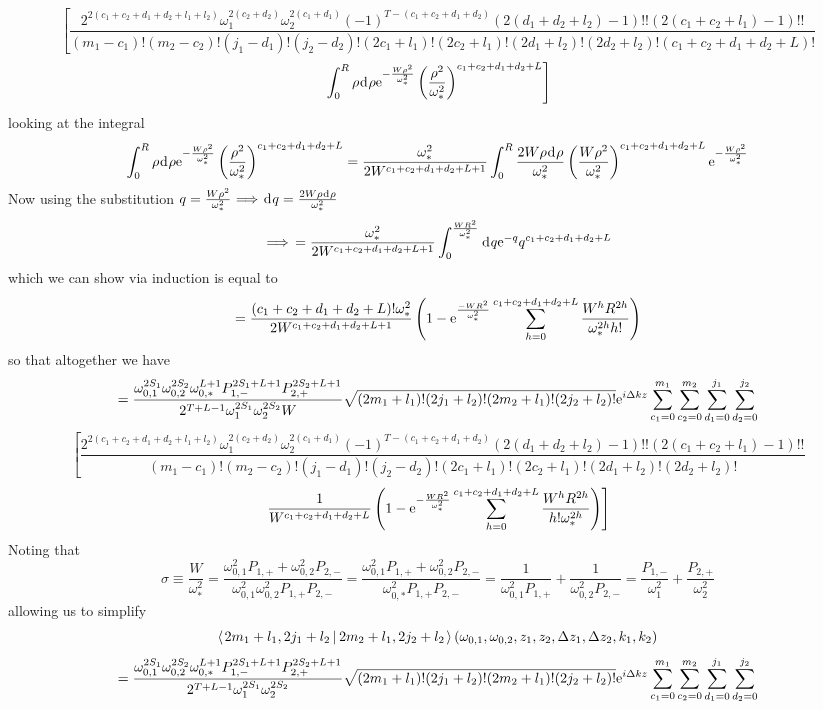 \documentclass[11pt]{amsart}
\makeatletter
\newcommand{\e}{{\rm e}}				%
\newcommand{\msp}[1]{\mspace{#1mu}}		%
\newcommand{\0}{\varnothing}		%
\DeclareMathOperator*{\im}{\, \Longrightarrow \,}	%
\newcommand{\eq}{\equiv}		%
\newcommand{\dd}{\msp{1} {\rm{d}} \msp{1}}	%
\newcommand{\brac}[2]{\left\langle\msp{2} #1\left\lvert \msp{3.5} #2 \right.\right\rangle}	%
\newcommand{\1}{!}
\newcommand{\2}{@}
\newcommand{\3}{\#}
\newcommand{\4}{\$}
\newcommand{\5}{\%}
\newcommand{\6}{$^\wedge$}
\newcommand{\7}{\&}
\newcommand{\8}{*}
\newcommand{\9}{(}
\makeatother
\begin{document}
\[
\left[ \frac{2^{2(c_1+c_2+d_1+d_2+l_1+l_2)}\omega_1^{2(c_2+d_2)}\omega_2^{2(c_1+d_1)}(-1)^{T-(c_1+c_2+d_1+d_2)}(2(d_1+d_2+l_2)-1)!!(2(c_1+c_2+l_1)-1)!!}{(m_1-c_1)!(m_2-c_2)!(j_1-d_1)!(j_2-d_2)!(2c_1+l_1)!(2c_2+l_1)!(2d_1+l_2)!(2d_2+l_2)!(c_1+c_2+d_1+d_2+L)!}\right.
\]
\[
\left. \int_0^R\rho \dd \rho \e^{-\frac{W\rho^2}{\omega_*^2}}\left(\frac{\rho^2}{\omega_*^2}\right)^{c_1+c_2+d_1+d_2+L}\right] 
\]
looking at the integral
\[
\int_0^R\rho \dd \rho \e^{-\frac{W\rho^2}{\omega_*^2}}\left(\frac{\rho^2}{\omega_*^2}\right)^{c_1+c_2+d_1+d_2+L}= \frac{\omega_*^2}{2W^{c_1+c_2+d_1+d_2+L+1}} \int_0^R \frac{2W\rho\dd \rho}{\omega_*^2}\left(\frac{W\rho^2}{\omega_*^2}\right)^{c_1+c_2+d_1+d_2+L} \e^{-\frac{W\rho^2}{\omega_*^2}}
\]
Now using the substitution $q = \frac{W\rho^2}{\omega_*^2}\im \dd q = \frac{2W\rho \dd \rho}{\omega_*^2}$
\[
\im = \frac{\omega_*^2}{2W^{c_1+c_2+d_1+d_2+L+1}}\int_0^{\frac{WR^2}{\omega_*^2}}\dd q\e^{-q}q^{c_1+c_2+d_1+d_2+L}
\]
which we can show via induction is equal to
\[
= \frac{(c_1+c_2+d_1+d_2+L)!\omega_*^2}{2W^{c_1+c_2+d_1+d_2+L+1}}\left(1-\e^{\frac{-WR^2}{\omega_*^2}}\sum_{h=0}^{c_1+c_2+d_1+d_2+L}\frac{W^hR^{2h}}{\omega_*^{2h}h!}\right)
\]
so that altogether we have
\[
=\frac{\omega_{0,1}^{2S_1}\omega_{0,2}^{2S_2}\omega_{0,*}^{L+1}P_{1,-}^{2S_1+L+1}P_{2,+}^{2S_2+L+1}}{2^{T+L-1}\omega_1^{2S_1}\omega_2^{2S_2}W}\sqrt{(2m_1+l_1)!(2j_1+l_2)!(2m_2+l_1)!(2j_2+l_2)!}\e^{i\Delta kz}\sum_{c_1=0}^{m_1}\sum_{c_2=0}^{m_2}\sum_{d_1=0}^{j_1}\sum_{d_2=0}^{j_2}
\]
\[
\left[ \frac{2^{2(c_1+c_2+d_1+d_2+l_1+l_2)}\omega_1^{2(c_2+d_2)}\omega_2^{2(c_1+d_1)}(-1)^{T-(c_1+c_2+d_1+d_2)}(2(d_1+d_2+l_2)-1)!!(2(c_1+c_2+l_1)-1)!!}{(m_1-c_1)!(m_2-c_2)!(j_1-d_1)!(j_2-d_2)!(2c_1+l_1)!(2c_2+l_1)!(2d_1+l_2)!(2d_2+l_2)!}\right.
\]
\[
\left.\frac{1}{W^{c_1+c_2+d_1+d_2+L}}\left(1-\e^{-\frac{WR^2}{\omega_*^2}}\sum_{h=0}^{c_1+c_2+d_1+d_2+L}\frac{W^hR^{2h}}{h!\omega_*^{2h}}\right)\right]
\]
Noting that
\[
\sigma \eq \frac{W}{\omega_*^2} = \frac{\omega_{0,1}^2P_{1,+}+\omega_{0,2}^2P_{2,-}}{\omega_{0,1}^2\omega_{0,2}^2P_{1,+}P_{2,-}} = \frac{\omega_{0,1}^2P_{1,+}+\omega_{0,2}^2P_{2,-}}{\omega_{0,*}^2P_{1,+}P_{2,-}} =\frac{1}{\omega_{0,1}^2P_{1,+}}+\frac{1}{\omega_{0,2}^2P_{2,-}} = \frac{P_{1,-}}{\omega_1^2}+\frac{P_{2,+}}{\omega_2^2}
\] 
allowing us to simplify
\[
\brac{2m_1+l_1,2j_1+l_2}{2m_2+l_1,2j_2+l_2}(\omega_{0,1},\omega_{0,2},z_1,z_2,\Delta z_1,\Delta z_2,k_1,k_2)
\]
\[
=\frac{\omega_{0,1}^{2S_1}\omega_{0,2}^{2S_2}\omega_{0,*}^{L+1}P_{1,-}^{2S_1+L+1}P_{2,+}^{2S_2+L+1}}{2^{T+L-1}\omega_1^{2S_1}\omega_2^{2S_2}}\sqrt{(2m_1+l_1)!(2j_1+l_2)!(2m_2+l_1)!(2j_2+l_2)!}\e^{i\Delta kz}\sum_{c_1=0}^{m_1}\sum_{c_2=0}^{m_2}\sum_{d_1=0}^{j_1}\sum_{d_2=0}^{j_2}
\]
\end{document}
